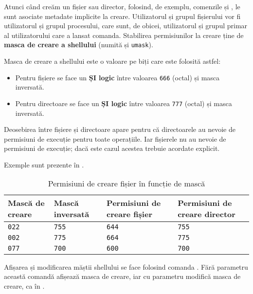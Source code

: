 Atunci când creăm un fișier sau director, folosind, de exemplu, comenzile 
și , le sunt asociate metadate implicite la creare. Utilizatorul și grupul
fișierului vor fi utilizatorul și grupul procesului, care sunt, de obicei,
utilizatorul și grupul primar al utilizatorului care a lansat comanda.
Stabilirea permisiunilor la creare ține de \textbf{masca de creare a shellului} (numită și \texttt{umask}).

Masca de creare a shellului este o valoare pe biți care este folosită astfel:

\begin{itemize}
  \item Pentru fișiere se face un \textbf{ȘI logic} între valoarea \texttt{666} (octal) și
		masca inversată.
  \item Pentru directoare se face un \textbf{ȘI logic} între valoarea \texttt{777} (octal)
		și masca inversată.
\end{itemize}

Deosebirea între fișiere și directoare apare pentru că directoarele au nevoie de permisiuni de execuție pentru
toate operațiile. Iar fișierele nu au nevoie de permisiuni de execuție; dacă
este cazul acestea trebuie acordate explicit.

Exemple sunt prezente în .

\begin{table}[!htb]
\begin{center}
  \begin{tabular}{ p{} p{} p{} p{} }
	\toprule
                \textbf{Mască de creare} & \textbf{Mască inversată} & \textbf{Permisiuni de creare fișier} & \textbf{Permisiuni de creare director} \\
	\midrule
                \texttt{022} & \texttt{755} & \texttt{644} & \texttt{755} \\
	\midrule
                \texttt{002} & \texttt{775} & \texttt{664} & \texttt{775} \\
	\midrule
                \texttt{077} & \texttt{700} & \texttt{600} & \texttt{700} \\
	\bottomrule
	\end{tabular}
\end{center}
\caption{Permisiuni de creare fișier în funcție de mască}
\label{table:user:umask}
\end{table}

Afișarea și modificarea măștii shellului se face folosind comanda . Fără
parametru această comandă afișează masca de creare, iar cu parametru modifică
masca de creare, ca în .

